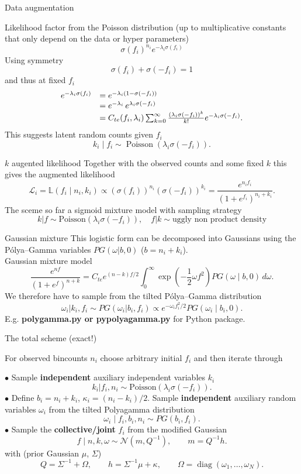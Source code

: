\documentclass[11pt]{beamer}
\newcommand{\sigmoid}{\sigma}
\begin{document}
\begin{frame}{Data augmentation}

Likelihood factor from the Poisson distribution (up to multiplicative constants 
that only depend on the data or hyper parameters)
$$
    \sigma(f_i)^{n_i} e^{-\lambda_i \sigma(f_i)}
$$
Using symmetry
$$
\sigma(f_i) + \sigma(-f_i) = 1
$$
and thus at fixed $f_i$
\[
\begin{array}{rl}
e^{-\lambda_i\sigma(f_i)} &= e^{-\lambda_i(1 - \sigma(-f_i))}\cr
&= e^{-\lambda_i}\,e^{\lambda_i\sigma(-f_i)} \cr
&= C_{te}(f_i,\lambda_i)\sum_{k=0}^\infty 
\frac{(\lambda_i\sigma(-f_i))^k}{k!} e^{-\lambda_i\sigma(-f_i)}.
\end{array}
\]
This suggests latent random counts given $f_i$
\[
k_i\mid f_i \sim \operatorname{Poisson}(\lambda_i\sigmoid(-f_i)).
\]

\end{frame}

\begin{frame}{$k$ augented likelihood}
Together with the observed counts and some fixed $k$
 this gives the augmented likelihood
\[
\mathcal{L}_i = 
\mathbb{L}(f_i \mid n_i, k_i)
\propto
\left(\sigmoid(f_i)\right)^{n_i}
\left(\sigmoid(-f_i)\right)^{k_i}
=
\frac{e^{n_i f_i}}{(1+e^{f_i})^{n_i+k_i}}.
\]
The sceme so far a sigmoid mixture model with sampling strategy
$$
k | f  \sim \mbox{Poisson}(\lambda_i\sigma(-f_i)),\quad f | k \sim \mbox{uggly non product density}
$$

\end{frame}
\begin{frame}{Gaussian mixture}
\medskip
This logistic form can be decomposed into Gaussians using the P\'olya--Gamma 
variables $PG(\omega| b, 0)$ ($b=n_i+k_i$).\\
Gaussian mixture model
\[
\frac{e^{n f}}{(1+e^{f})^{n+k}}
= C_{te} e^{ (n-k) f / 2}
\int_0^\infty
\exp\left(
-\frac12\omega f^2 
\right)
PG(\omega\mid b,0)\,d\omega.
\]
We therefore have to sample from the tilted P\'olya--Gamma distribution
$$
\omega_i| k_i, f_i  \sim PG(\omega_i| b_i, f_i) \propto e^{-\omega_i f_i^2/2} PG(\omega_i\mid b_i,0).
$$
E.g. \textbf{polygamma.py or pypolyagamma.py} for Python package.
\end{frame}

\begin{frame}{The total scheme (exact!)}

For observed bincounts $n_i$ choose arbitrary initial 
$f_i$ and then iterate through

$\bullet$ Sample \textbf{independent} auxiliary independent variables $k_i$
$$
k_i | f_i, n_i \sim \mbox{Poisson} ( \lambda_i \sigmoid(-f_i)).
$$
$\bullet$ Define $b_i=n_i+k_i$, $\kappa_i=(n_i-k_i)/2$.
Sample \textbf{independent} auxiliary random variables $\omega_i$ from the tilted Polyagamma distribution
\[
\omega_i\mid f_i,b_i,n_i \sim PG(b_i,f_i).
\]
$\bullet$ Sample the \textbf{collective/joint} $f_i$ from the modified Gaussian
\[
f\mid n,k,\omega \sim \mathcal N(m,Q^{-1}),
\qquad
m=Q^{-1}h.
\]
with (prior Gaussian $\mu$, $\Sigma$)
\[
Q=\Sigma^{-1}+\Omega,
\qquad
h=\Sigma^{-1}\mu+\kappa,
\qquad
\Omega=\operatorname{diag}(\omega_1,\dots,\omega_N).
\]

\end{frame}
\end{document}
